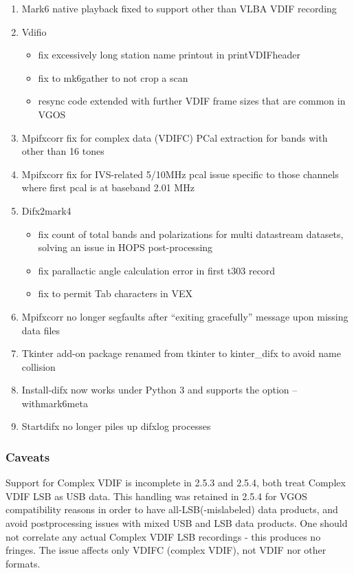 \begin{enumerate}
\item Mark6 native playback fixed to support other than VLBA VDIF recording
\item Vdifio
\begin{itemize}
  \item fix excessively long station name printout in printVDIFheader
  \item fix to mk6gather to not crop a scan
  \item resync code extended with further VDIF frame sizes that are common in VGOS
\end{itemize}
\item Mpifxcorr fix for complex data (VDIFC) PCal extraction for bands with other than 16 tones
\item Mpifxcorr fix for IVS-related 5/10MHz pcal issue specific to those channels where first pcal is at baseband 2.01 MHz
\item Difx2mark4
\begin{itemize}
  \item fix count of total bands and polarizations for multi datastream datasets, solving an issue in HOPS post-processing
  \item fix parallactic angle calculation error in first t303 record
  \item fix to permit Tab characters in VEX
\end{itemize}
\item Mpifxcorr no longer segfaults after ``exiting gracefully'' message upon missing data files
\item Tkinter add-on package renamed from tkinter to kinter\_difx to avoid name collision
\item Install-difx now works under Python 3 and supports the option –withmark6meta
\item Startdifx no longer piles up difxlog processes
\end{enumerate}

\subsubsection{Caveats}

Support for Complex VDIF is incomplete in 2.5.3 and 2.5.4, both treat Complex VDIF LSB as USB data. This handling was retained in 2.5.4
for VGOS compatibility reasons in order to have all-LSB(-mislabeled) data products, and avoid postprocessing issues with
mixed USB and LSB data products. One should not correlate any actual Complex VDIF LSB recordings - this produces no fringes.
The issue affects only VDIFC (complex VDIF), not VDIF nor other formats.

